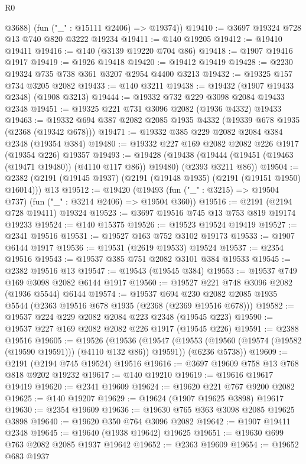 \begin{lexlean}{R0}
\begin{coremodule}
        @3688)
      (fun ("_" : @15111 @2406) => @19374))
@19410 := @3697 @19324 @728 @13 @740 @820 @3222 @19234
@19411 := @140 @19205
@19412 := @19410 @19411
@19416 := @140 (@3139 @19220 @704 @86)
@19418 := @1907 @19416 @1917
@19419 := @1926 @19418
@19420 := @19412 @19419
@19428 := @2230 @19324 @735 @738 @361 @3207 @2954 @4400 @3213
@19432 := @19325 @157 @734 @3205 @2082
@19433 := @140 @3211
@19438 := @19432 (@1907 @19433 @2348) (@1908 @3213)
@19444 := @19332 @732 @229 @3098 @2084 @19433 @2348
@19451 := @19325 @221 @731 @3096 @2082 (@1936 @4332) @19433
@19463 := @19332 @694 @387 @2082 @2085 @1935 @4332 (@19339 @678 @1935 (@2368 (@19342 @678)))
@19471 := @19332 @385 @229 @2082 @2084 @384 @2348 (@19354 @384)
@19480 := @19332 @227 @169 @2082 @2082 @226 @1917 (@19354 @226) @19357
@19493 := @19428
    (@19438 (@19444 (@19451 (@19463 (@19471 @19480)) (@4110 @117 @86)) @19480) (@2393 @3211 @86))
@19504 := @2382 (@2191 (@19145 @1937) (@2191 (@19148 @1935) (@2191 (@19151 @1950) @16014))) @13
@19512 := @19420
    (@19493 (fun ("_" : @3215) => @19504 @737) (fun ("_" : @3214 @2406) => @19504 @360))
@19516 := @2191 (@2194 @728 @19411) @19324
@19523 := @3697 @19516 @745 @13 @753 @819 @19174 @19233
@19524 := @140 @15375
@19526 := @19523 @19524 @19419
@19527 := @2341 @19516
@19531 := @19527 @163 @752 @3102 @19173
@19533 := @1907 @6144 @1917
@19536 := @19531 (@2619 @19533) @19524
@19537 := @2354 @19516
@19543 := @19537 @385 @751 @2082 @3101 @384 @19533
@19545 := @2382 @19516 @13
@19547 := @19543 (@19545 @384)
@19553 := @19537 @749 @169 @3098 @2082 @6144 @1917
@19560 := @19527 @221 @748 @3096 @2082 (@1936 @5544) @6144
@19574 := @19537
    @694
    @230
    @2082
    @2085
    @1935
    @5544
    (@2363 @19516 @678 @1935 (@2368 (@2369 @19516 @678)))
@19582 := @19537 @224 @229 @2082 @2084 @223 @2348 (@19545 @223)
@19590 := @19537 @227 @169 @2082 @2082 @226 @1917 (@19545 @226)
@19591 := @2388 @19516
@19605 := @19526
    (@19536
      (@19547 (@19553 (@19560 (@19574 (@19582 (@19590 @19591))) (@4110 @132 @86)) @19591))
      (@6236 @5738))
@19609 := @2191 (@2194 @745 @19524) @19516
@19616 := @3697 @19609 @758 @13 @768 @818 @9202 @19232
@19617 := @140 @19210
@19619 := @19616 @19617 @19419
@19620 := @2341 @19609
@19624 := @19620 @221 @767 @9200 @2082
@19625 := @140 @19207
@19629 := @19624 (@1907 @19625 @3898) @19617
@19630 := @2354 @19609
@19636 := @19630 @765 @363 @3098 @2085 @19625 @3898
@19640 := @19620 @350 @764 @3096 @2082
@19642 := @1907 @19411 @2348
@19645 := @19640 (@1938 @19642) @19625
@19651 := @19630 @699 @763 @2082 @2085 @1937 @19642
@19652 := @2363 @19609
@19654 := @19652 @683 @1937

\end{coremodule}
\end{lexlean}
